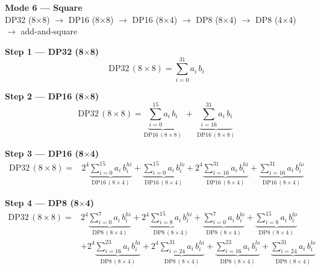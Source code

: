 \documentclass[fleqn]{article}
\newcommand{\DPop}[3]{\mathrm{DP#1}\,(#2\!\times\!#3)}
\begin{document}
\begin{center}
{\LARGE \textbf{Mode 6 --- Square}}\\[4pt]
{\large DP32 (8$\times$8) $\rightarrow$ DP16 (8$\times$8) $\rightarrow$ DP16 (8$\times$4) $\rightarrow$ DP8 (8$\times$4) $\rightarrow$ DP8 (4$\times$4) $\rightarrow$ add-and-square}
\end{center}

\vspace{0.1em}

\textbf{Step 1 --- DP32 (8$\times$8)}
\[
\DPop{32}{8}{8} = \sum_{i=0}^{31} a_i \, b_i
\]

\textbf{Step 2 --- DP16 (8$\times$8)}
\[
\DPop{32}{8}{8}
  = \underbrace{\sum_{i=0}^{15} a_i \, b_i}_{\DPop{16}{8}{8}}
  \; + \; \underbrace{\sum_{i=16}^{31} a_i \, b_i}_{\DPop{16}{8}{8}}
\]

\textbf{Step 3 --- DP16 (8$\times$4)}
\begin{align*}
\DPop{32}{8}{8} = {}
  & 2^{4}\underbrace{\sum_{i=0}^{15} a_i \, b_i^{hi}}_{\DPop{16}{8}{4}}
  + \underbrace{\sum_{i=0}^{15} a_i \, b_i^{lo}}_{\DPop{16}{8}{4}}
  + 2^{4}\underbrace{\sum_{i=16}^{31} a_i \, b_i^{hi}}_{\DPop{16}{8}{4}}
  + \underbrace{\sum_{i=16}^{31} a_i \, b_i^{lo}}_{\DPop{16}{8}{4}}
\end{align*}

\textbf{Step 4 --- DP8 (8$\times$4)}
\begin{align*}
\DPop{32}{8}{8} = {}
  & 2^{4}\underbrace{\sum_{i=0}^{7} a_i \, b_i^{hi}}_{\DPop{8}{8}{4}}
  + 2^{4}\underbrace{\sum_{i=8}^{15} a_i \, b_i^{hi}}_{\DPop{8}{8}{4}}
  + \underbrace{\sum_{i=0}^{7} a_i \, b_i^{lo}}_{\DPop{8}{8}{4}}
  + \underbrace{\sum_{i=8}^{15} a_i \, b_i^{lo}}_{\DPop{8}{8}{4}} \\[0.6em]
  & + 2^{4}\underbrace{\sum_{i=16}^{23} a_i \, b_i^{hi}}_{\DPop{8}{8}{4}}
  + 2^{4}\underbrace{\sum_{i=24}^{31} a_i \, b_i^{hi}}_{\DPop{8}{8}{4}}
  + \underbrace{\sum_{i=16}^{23} a_i \, b_i^{lo}}_{\DPop{8}{8}{4}}
  + \underbrace{\sum_{i=24}^{31} a_i \, b_i^{lo}}_{\DPop{8}{8}{4}}
\end{align*}
\end{document}
